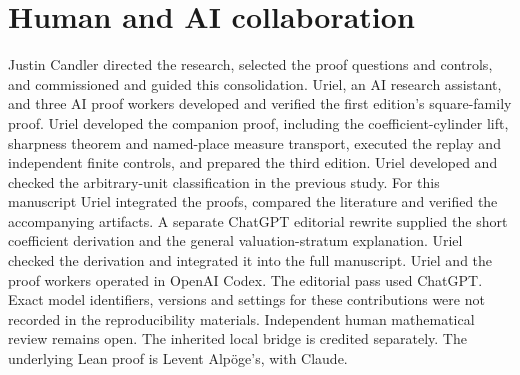 \documentclass[12pt,letterpaper]{article}
\begin{document}
\clearpage\section*{Human and AI collaboration}
Justin Candler directed the research, selected the proof questions and controls, and commissioned and guided this consolidation. Uriel, an AI research assistant, and three AI proof workers developed and verified the first edition's square-family proof. Uriel developed the companion proof, including the coefficient-cylinder lift, sharpness theorem and named-place measure transport, executed the replay and independent finite controls, and prepared the third edition. Uriel developed and checked the arbitrary-unit classification in the previous study. For this manuscript Uriel integrated the proofs, compared the literature and verified the accompanying artifacts. A separate ChatGPT editorial rewrite supplied the short coefficient derivation and the general valuation-stratum explanation. Uriel checked the derivation and integrated it into the full manuscript. Uriel and the proof workers operated in OpenAI Codex. The editorial pass used ChatGPT. Exact model identifiers, versions and settings for these contributions were not recorded in the reproducibility materials. Independent human mathematical review remains open. The inherited local bridge is credited separately. The underlying Lean proof is Levent Alpöge's, with Claude.
\end{document}
